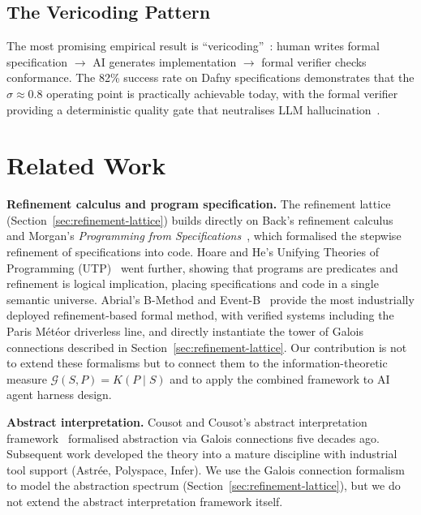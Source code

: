\documentclass[11pt, a4paper, logo, copyright]{googledeepmind}
\begin{document}
\subsection{The Vericoding Pattern}

The most promising empirical result is ``vericoding''~\citep{vericoding2025}: human writes formal specification $\to$ AI generates implementation $\to$ formal verifier checks conformance. The 82\% success rate on Dafny specifications demonstrates that the $\sigma \approx 0.8$ operating point is practically achievable today, with the formal verifier providing a deterministic quality gate that neutralises LLM hallucination~\citep{kleppmann2025formal}.


\section{Related Work}
\label{sec:related-work}

\textbf{Refinement calculus and program specification.} The refinement lattice (Section~\ref{sec:refinement-lattice}) builds directly on Back's refinement calculus~\citep{back1980correctness} and Morgan's \emph{Programming from Specifications}~\citep{morgan1994programming}, which formalised the stepwise refinement of specifications into code. Hoare and He's Unifying Theories of Programming (UTP)~\citep{hoare1998unifying} went further, showing that programs are predicates and refinement is logical implication, placing specifications and code in a single semantic universe. Abrial's B-Method and Event-B~\citep{abrial2010modeling} provide the most industrially deployed refinement-based formal method, with verified systems including the Paris M\'{e}t\'{e}or driverless line, and directly instantiate the tower of Galois connections described in Section~\ref{sec:refinement-lattice}. Our contribution is not to extend these formalisms but to connect them to the information-theoretic measure $\mathcal{G}(S, P) = K(P \mid S)$ and to apply the combined framework to AI agent harness design.

\textbf{Abstract interpretation.} Cousot and Cousot's abstract interpretation framework~\citep{cousot1977abstract} formalised abstraction via Galois connections five decades ago. Subsequent work developed the theory into a mature discipline with industrial tool support (Astr\'{e}e, Polyspace, Infer). We use the Galois connection formalism to model the abstraction spectrum (Section~\ref{sec:refinement-lattice}), but we do not extend the abstract interpretation framework itself.
\end{document}
